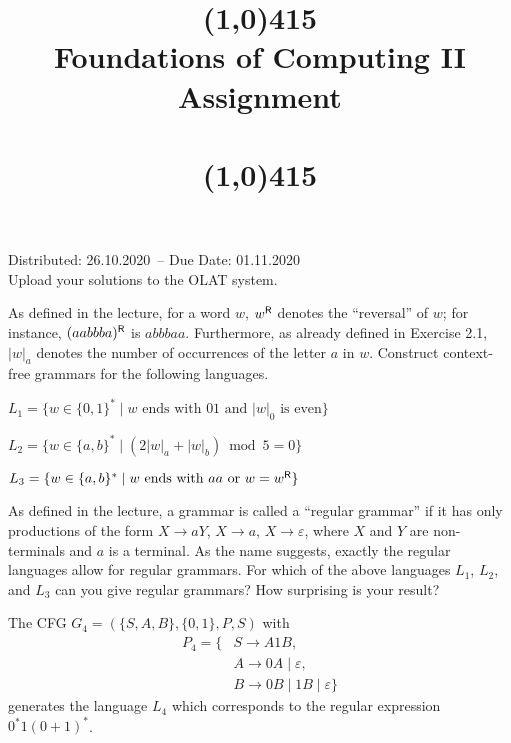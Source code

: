\documentclass{exercise}
\title{\line(1,0){415}\\
  Foundations of Computing II\\
  \Large Assignment \theexercise\\[1em]
  \large{\topics}\\
  \line(1,0){415}}
\newcommand{\distdate}{26.10.2020}
\newcommand{\duedate}{01.11.2020}
\begin{document}
\maketitle

\begin{center}
  Distributed: \distdate\ -- Due Date: \duedate\\[1em]
  Upload your solutions to the OLAT system.\\[3em]
\end{center}


As defined in the lecture, for a word $w$, $w^{\textsf{R}}$ denotes the ``reversal''
of $w$; for instance, $(aabbba)^{\textsf{R}}$ is $abbbaa$.  Furthermore, as already defined
in Exercise 2.1, $|w|_a$ denotes the number of occurrences of the letter $a$ in
$w$.  Construct context-free grammars for the following languages.

\subtask $L_1 = \{w \in \{0,1\}^* \mid w\text{ ends with }01\text{ and }|w|_0\text{ is even}\}$


\subtask $L_2 = \{w \in \{a,b\}^* \mid (2|w|_a+|w|_b) \bmod 5 = 0\}$


\subtask $L_3 = \{w \in \{a,b\}^* \mid w \text{ ends with }aa\text{ or }w = w^{\textsf{R}} \}$


\subtask As defined in the lecture, a grammar is called a ``regular grammar''
  if it has only productions of the form $X\to aY$, $X\to a$, $X\to\varepsilon$,
  where $X$ and $Y$ are non-terminals and $a$ is a terminal.  As the name
  suggests, exactly the regular languages allow for regular grammars.  For
  which of the above languages $L_1$, $L_2$, and $L_3$ can you give regular
  grammars?  How surprising is your result?



The CFG $G_4=(\{S,A,B\},\{0,1\},P,S)$ with
\begin{align*}
  P_4 = \{ & S \to A1B, \\
           & A \to 0A \mid \varepsilon,\\
           & B \to 0B \mid 1B \mid \varepsilon\}
\end{align*}
generates the language $L_4$ which corresponds to the regular expression $0^*1(0+1)^*$.
\end{document}
